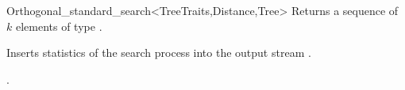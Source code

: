 \begin{ccRefClass}{Orthogonal_standard_search<TreeTraits,Distance,Tree>}
{Returns a sequence of $k$ elements of type }.


\begin{ccAdvanced}
{
Inserts statistics of the search process into the output stream .
}
\end{ccAdvanced}

\ccSeeAlso

.

\end{ccRefClass}


